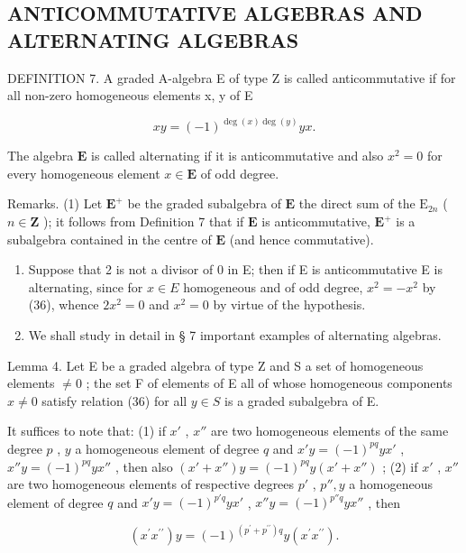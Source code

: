 \subsection{ANTICOMMUTATIVE ALGEBRAS AND ALTERNATING ALGEBRAS}

DEFINITION 7. A graded A-algebra E of type Z is called anticommutative if for all non-zero homogeneous elements x, y of E

\[
x y = (- 1) ^ {\deg (x) \deg (y)} y x.\tag{36}
\]

The algebra \(\mathbf{E}\) is called alternating if it is anticommutative and also \(x^{2} = 0\) for every homogeneous element \(x\in \mathbf{E}\) of odd degree.

Remarks. (1) Let \(\mathbf{E}^{+}\) be the graded subalgebra of \(\mathbf{E}\) the direct sum of the \(\mathrm{E}_{2n}\) ( \(n \in \mathbf{Z}\) ); it follows from Definition 7 that if \(\mathbf{E}\) is anticommutative, \(\mathbf{E}^{+}\) is a subalgebra contained in the centre of \(\mathbf{E}\) (and hence commutative).

\begin{enumerate}
\def\labelenumi{(\arabic{enumi})}
\setcounter{enumi}{1}
\item
  Suppose that 2 is not a divisor of 0 in E; then if E is anticommutative E is alternating, since for \(x \in E\) homogeneous and of odd degree, \(x^{2} = -x^{2}\) by (36), whence \(2x^{2} = 0\) and \(x^{2} = 0\) by virtue of the hypothesis.
\item
  We shall study in detail in § 7 important examples of alternating algebras.
\end{enumerate}

Lemma 4. Let E be a graded algebra of type Z and S a set of homogeneous elements \(\neq0\) ; the set F of elements of E all of whose homogeneous components \(x\neq0\) satisfy relation (36) for all \(y\in S\) is a graded subalgebra of E.

It suffices to note that: (1) if \(x'\) , \(x''\) are two homogeneous elements of the same degree \(p\) , \(y\) a homogeneous element of degree \(q\) and \(x'y = (-1)^{pq}yx'\) , \(x''y = (-1)^{pq}yx''\) , then also \((x' + x'')y = (-1)^{pq}y(x' + x'')\) ; (2) if \(x'\) , \(x''\) are two homogeneous elements of respective degrees \(p'\) , \(p'', y\) a homogeneous element of degree \(q\) and \(x'y = (-1)^{p'q}yx'\) , \(x''y = (-1)^{p''q}yx''\) , then

\[
(x ^ {\prime} x ^ {\prime \prime}) y = (- 1) ^ {(p ^ {\prime} + p ^ {\prime \prime}) q} y (x ^ {\prime} x ^ {\prime \prime}).
\]

